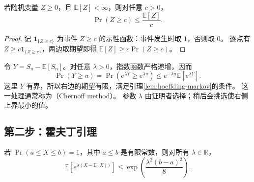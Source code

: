 \documentclass[UTF8]{ctexart}
\begin{document}
\begin{lemma}[马尔可夫不等式]
\label{lem:hoeffding-markov}
若随机变量 $Z\geq0$，且 $\mathbb E[Z]<\infty$，则对任意 $c>0$，
\[
  \Pr(Z\geq c)\leq\frac{\mathbb E[Z]}{c}.
\]
\end{lemma}
\begin{proof}
记 $\mathbf 1_{\{Z\geq c\}}$ 为事件 $Z\geq c$ 的示性函数：事件发生时取 $1$，否则取 $0$。
逐点有 $Z\geq c\mathbf 1_{\{Z\geq c\}}$，两边取期望即得
$\mathbb E[Z]\geq c\Pr(Z\geq c)$。
\end{proof}

令 $Y=S_n-\mathbb E[S_n]$。对任意 $\lambda>0$，指数函数严格递增，因而
\begin{equation}
  \Pr(Y\geq u)
  =\Pr(e^{\lambda Y}\geq e^{\lambda u})
  \leq e^{-\lambda u}\mathbb E[e^{\lambda Y}].
  \label{eq:hoeffding-exponential-markov}
\end{equation}
这里 $Y$ 有界，所以右边的期望有限，满足引理\ref{lem:hoeffding-markov}的条件。
这一处理通常称为（Chernoff method）。
参数 $\lambda$ 由证明者选择；稍后会挑选使右侧上界最小的值。

\subsection{第二步：霍夫丁引理}

\begin{lemma}[霍夫丁引理]
\label{lem:hoeffding-mgf}
若 $\Pr(a\leq X\leq b)=1$，其中 $a\leq b$ 是有限常数，则对所有 $\lambda\in\mathbb R$，
\begin{equation}
  \mathbb E\!\left[e^{\lambda(X-\mathbb E[X])}\right]
  \leq\exp\!\left(\frac{\lambda^2(b-a)^2}{8}\right).
  \label{eq:hoeffding-lemma}
\end{equation}
\end{lemma}
\end{document}
